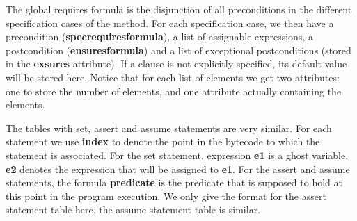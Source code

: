 \documentclass[a4paper]{llncs}
\begin{document}
\noindent{}

The global requires formula is the disjunction of all preconditions in
the different specification cases of the method. For each
specification case, we then have a precondition
(\textbf{spec\unsc requires\unsc formula}), a list of assignable expressions,
a postcondition (\textbf{ensures\unsc formula}) and a list of exceptional
postconditions (stored in the \textbf{exsures} attribute). If a clause
is not explicitly specified, its default value will be stored
here. Notice that for each list of elements we get two attributes: one
to store the number of elements, and one attribute actually containing
the elements.

The tables with set, assert and assume statements are very
similar. For each statement we use \textbf{index} to denote the point
in the bytecode to which the statement is associated. For the set
statement, expression \textbf{e1} is a ghost variable, \textbf{e2}
denotes the expression that will be assigned to \textbf{e1}. For the
assert and assume statements, the formula \textbf{predicate} is the
predicate that is supposed to hold at this point in the program
execution. We only give the format for the assert statement table
here, the assume statement table is similar.\\
\end{document}

